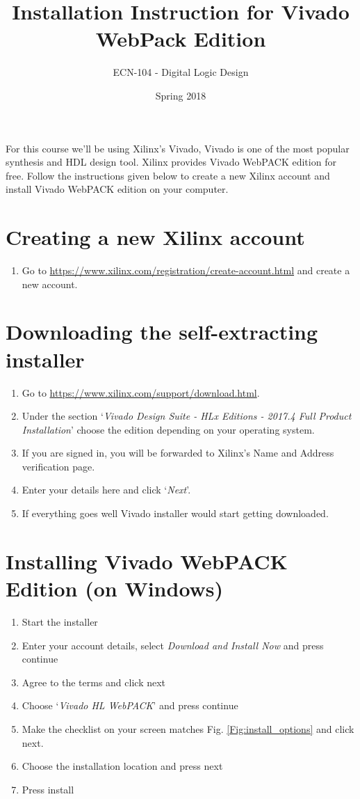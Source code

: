 \documentclass{article}
\title{Installation Instruction for Vivado WebPack Edition}
\author{ECN-104 - Digital Logic Design }
\date{Spring 2018}
\begin{document}
\maketitle
\hypersetup{urlcolor=blue}
For this course we'll be using Xilinx's Vivado, Vivado is one of the most popular synthesis and HDL design tool. Xilinx provides Vivado WebPACK edition for free. Follow the instructions given below to create a new Xilinx account and install Vivado WebPACK edition on your computer. 

\section{Creating a new Xilinx account}
\begin{enumerate}
\item Go to \url{https://www.xilinx.com/registration/create-account.html} and create a new account.
\end{enumerate}

\section{Downloading the self-extracting installer}
\begin{enumerate}
\item Go to \url{https://www.xilinx.com/support/download.html}.
\item Under the section `\textit{Vivado Design Suite - HLx Editions - 2017.4  Full Product Installation}' choose the edition depending on your operating system.
\item If you are signed in, you will be forwarded to Xilinx's Name and Address verification page.
\item Enter your details here and click `\textit{Next}'.
\item If everything goes well Vivado installer would start getting downloaded.
\end{enumerate}

\section{Installing Vivado WebPACK Edition (on Windows)}
\begin{enumerate}
    \item Start the installer
    \item Enter your account details, select \textit{Download and Install Now} and press continue
    \item Agree to the terms and click next
    \item Choose `\textit{Vivado HL WebPACK}' and press continue
    \item Make the checklist on your screen matches Fig. \ref{Fig:install_options} and click next.
    \item Choose the installation location and press next
    \item Press install
\end{enumerate}
\end{document}
